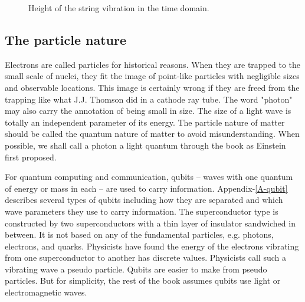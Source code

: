 \documentclass[oneside, letter, 12pt]{book}
\begin{document}
\begin{figure}[h]\label{Wave}
\caption{Height of the string vibration in the time domain.}
\end{figure}

\subsection{The particle nature}
Electrons are called particles for historical reasons. When they are trapped to the small scale of nuclei, they fit the image of point-like particles with negligible sizes and observable locations. This image is certainly wrong if they are freed from the trapping like what J.J. Thomson did in a cathode ray tube. The word "photon" may also carry the annotation of being small in size. The size of a light wave is totally an independent parameter of its energy. The particle nature of matter should be called the quantum nature of matter to avoid misunderstanding. When possible, we shall call a photon a light quantum through the book as Einstein first proposed.

For quantum computing and communication, qubits -- waves with one quantum of energy or mass in each -- are used to carry information. Appendix-\ref{A-qubit} describes several types of qubits including how they are separated and which wave parameters they use to carry information. The superconductor type is constructed by two superconductors with a thin layer of insulator sandwiched in between. It is not based on any of the fundamental particles, e.g. photons, electrons, and quarks. Physicists have found the energy of the electrons vibrating from one superconductor to another has discrete values. Physicists call such a vibrating wave a pseudo particle. Qubits are easier to make from pseudo particles. But for simplicity, the rest of the book assumes qubits use light or electromagnetic waves.
\end{document}
